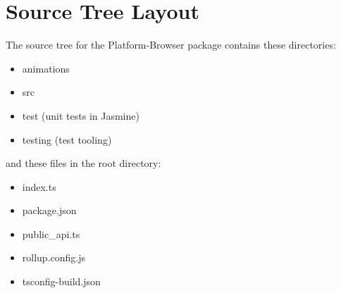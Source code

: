 \section{Source Tree Layout}

The source tree for the Platform-Browser package contains these directories:

\begin{itemize}
  \item animations
  \item src
  \item test (unit tests in Jasmine)
  \item testing (test tooling)
\end{itemize}

and these files in the root directory:

\begin{itemize}
  \item index.ts
  \item package.json
  \item public\_api.ts
  \item rollup.config.js
  \item tsconfig-build.json
\end{itemize}
